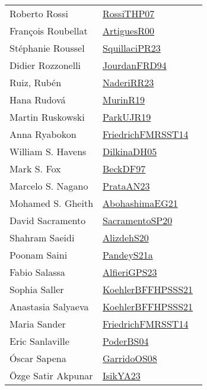 {\begin{longtable}{p{4cm}p{20cm}}
Roberto Rossi & \href{papers/RossiTHP07.pdf}{RossiTHP07}~\cite{RossiTHP07}\\
Fran{\c{c}}ois Roubellat & \href{articles/ArtiguesR00.pdf}{ArtiguesR00}~\cite{ArtiguesR00}\\
St{\'{e}}phanie Roussel & \href{papers/SquillaciPR23.pdf}{SquillaciPR23}~\cite{SquillaciPR23}\\
Didier Rozzonelli & \href{}{JourdanFRD94}~\cite{JourdanFRD94}\\
Ruiz, Rub\'{e}n & \href{articles/NaderiRR23.pdf}{NaderiRR23}~\cite{NaderiRR23}\\
Hana Rudov{\'{a}} & \href{papers/MurinR19.pdf}{MurinR19}~\cite{MurinR19}\\
Martin Ruskowski & \href{papers/ParkUJR19.pdf}{ParkUJR19}~\cite{ParkUJR19}\\
Anna Ryabokon & \href{}{FriedrichFMRSST14}~\cite{FriedrichFMRSST14}\\
William S. Havens & \href{papers/DilkinaDH05.pdf}{DilkinaDH05}~\cite{DilkinaDH05}\\
Mark S. Fox & \href{papers/BeckDF97.pdf}{BeckDF97}~\cite{BeckDF97}\\
Marcelo S. Nagano & \href{articles/PrataAN23.pdf}{PrataAN23}~\cite{PrataAN23}\\
Mohamed S. Gheith & \href{articles/AbohashimaEG21.pdf}{AbohashimaEG21}~\cite{AbohashimaEG21}\\
David Sacramento & \href{articles/SacramentoSP20.pdf}{SacramentoSP20}~\cite{SacramentoSP20}\\
Shahram Saeidi & \href{}{AlizdehS20}~\cite{AlizdehS20}\\
Poonam Saini & \href{articles/PandeyS21a.pdf}{PandeyS21a}~\cite{PandeyS21a}\\
Fabio Salassa & \href{articles/AlfieriGPS23.pdf}{AlfieriGPS23}~\cite{AlfieriGPS23}\\
Sophia Saller & \href{articles/KoehlerBFFHPSSS21.pdf}{KoehlerBFFHPSSS21}~\cite{KoehlerBFFHPSSS21}\\
Anastasia Salyaeva & \href{articles/KoehlerBFFHPSSS21.pdf}{KoehlerBFFHPSSS21}~\cite{KoehlerBFFHPSSS21}\\
Maria Sander & \href{}{FriedrichFMRSST14}~\cite{FriedrichFMRSST14}\\
Eric Sanlaville & \href{articles/PoderBS04.pdf}{PoderBS04}~\cite{PoderBS04}\\
{\'{O}}scar Sapena & \href{articles/GarridoOS08.pdf}{GarridoOS08}~\cite{GarridoOS08}\\
{\"{O}}zge Satir Akpunar & \href{articles/IsikYA23.pdf}{IsikYA23}~\cite{IsikYA23}\\

\end{longtable}}

